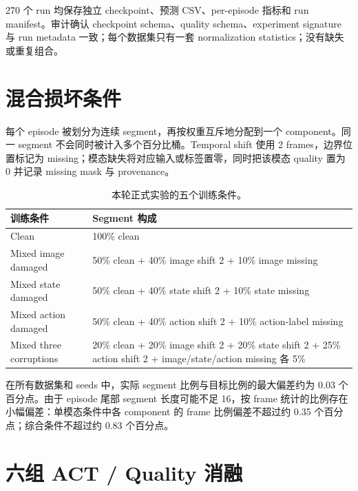 \documentclass[11pt,a4paper]{ctexart}
\begin{document}
\begin{tcolorbox}[colback=panel,colframe=rule,title={\color{navy}\bfseries 数据隔离与审计},fonttitle=\bfseries]
270 个 run 均保存独立 checkpoint、预测 CSV、per-episode 指标和 run manifest。审计确认 checkpoint schema、quality schema、experiment signature 与 run metadata 一致；每个数据集只有一套 normalization statistics；没有缺失或重复组合。
\end{tcolorbox}

\section{混合损坏条件}

每个 episode 被划分为连续 segment，再按权重互斥地分配到一个 component。同一 segment 不会同时被计入多个百分比桶。Temporal shift 使用 2 frames，边界位置标记为 missing；模态缺失将对应输入或标签置零，同时把该模态 quality 置为 0 并记录 missing mask 与 provenance。

\begin{table}[htbp]
\centering
\small
\begin{tabularx}{\linewidth}{p{39mm}Y}
\toprule
训练条件 & Segment 构成\\
\midrule
Clean & 100\% clean\\
Mixed image damaged & 50\% clean + 40\% image shift 2 + 10\% image missing\\
Mixed state damaged & 50\% clean + 40\% state shift 2 + 10\% state missing\\
Mixed action damaged & 50\% clean + 40\% action shift 2 + 10\% action-label missing\\
Mixed three corruptions & 20\% clean + 20\% image shift 2 + 20\% state shift 2 + 25\% action shift 2 + image/state/action missing 各 5\%\\
\bottomrule
\end{tabularx}
\caption{本轮正式实验的五个训练条件。}
\end{table}

在所有数据集和 seeds 中，实际 segment 比例与目标比例的最大偏差约为 0.03 个百分点。由于 episode 尾部 segment 长度可能不足 16，按 frame 统计的比例存在小幅偏差：单模态条件中各 component 的 frame 比例偏差不超过约 0.35 个百分点；综合条件不超过约 0.83 个百分点。

\section{六组 ACT / Quality 消融}
\end{document}

